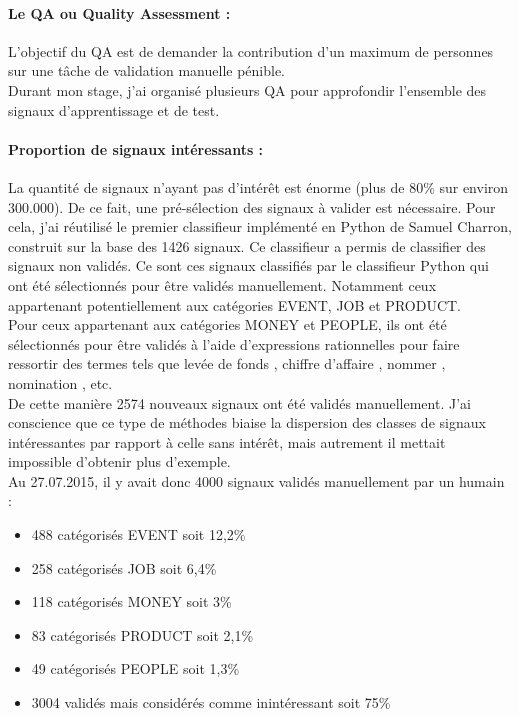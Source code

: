                 \paragraph{Le QA ou Quality Assessment :}
                    L'objectif du QA est de demander la contribution d'un maximum de personnes sur une tâche de validation manuelle pénible.\\
                    Durant mon stage, j'ai organisé plusieurs QA pour approfondir l'ensemble des signaux d’apprentissage et de test.

                \paragraph{Proportion de signaux intéressants :}
                    La quantité de signaux n'ayant pas d'intérêt est énorme (plus de 80\% sur environ 300.000). De ce fait, une pré-sélection des signaux à valider est nécessaire. Pour cela, j'ai réutilisé le premier classifieur implémenté en Python de Samuel Charron, construit sur la base des 1426 signaux. Ce classifieur a permis de classifier des signaux non validés. Ce sont ces signaux classifiés par le classifieur Python qui ont été sélectionnés pour être validés manuellement. Notamment ceux appartenant potentiellement aux catégories EVENT, JOB et PRODUCT.\\
                    Pour ceux appartenant aux catégories MONEY et PEOPLE, ils ont été sélectionnés pour être validés à l'aide d'expressions rationnelles pour faire ressortir des termes tels que \og levée de fonds \fg, \og chiffre d'affaire \fg, \og nommer \fg, \og nomination \fg, etc.\\
                    De cette manière 2574 nouveaux signaux ont été validés manuellement. J'ai conscience que ce type de méthodes biaise la dispersion des classes de signaux intéressantes par rapport à celle sans intérêt, mais autrement il mettait impossible d'obtenir plus d'exemple.\\

                    Au 27.07.2015, il y avait donc 4000 signaux validés manuellement par un humain :
                    \begin{itemize}
                        \item 488 catégorisés EVENT soit 12,2\%
                        \item 258 catégorisés JOB soit 6,4\%
                        \item 118 catégorisés MONEY soit 3\%
                        \item 83 catégorisés PRODUCT soit 2,1\%
                        \item 49 catégorisés PEOPLE soit 1,3\%
                        \item 3004 validés mais considérés comme inintéressant soit 75\%
                    \end{itemize}

